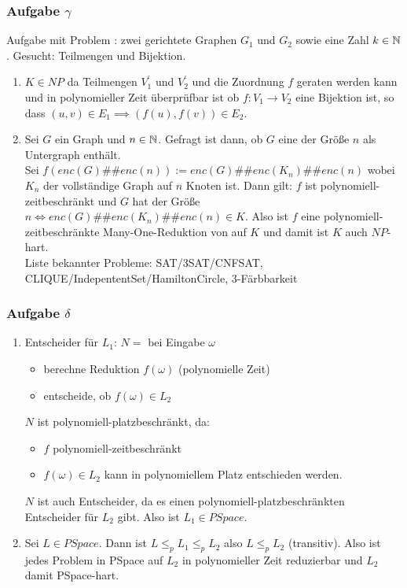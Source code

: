 \subsubsection*{Aufgabe $\gamma$}
    Aufgabe mit Problem : zwei gerichtete Graphen $G_{1}$ und $G_{2}$ sowie eine Zahl $k \in \mathbb{N}$. Gesucht: Teilmengen und Bijektion.
    \begin{enumerate}
        \item $K \in \mathit{NP}$ da Teilmengen $V^{'}_{1}$ und $V^{'}_{2}$ und die Zuordnung $f$ geraten werden kann und in polynomieller Zeit überprüfbar ist ob $f: V_{1} \to V_{2}$ eine Bijektion ist, so dass $(u,v) \in E_{1} \implies (f(u), f(v)) \in E_{2}$.

        \item Sei $G$ ein Graph und $n \in \mathbb{N}$. Gefragt ist dann, ob $G$ eine  der Größe $n$ als Untergraph enthält.\\
        Sei $f(enc(G)\#\#enc(n)) := enc(G)\#\#enc(K_{n})\#\#enc(n)$ wobei $K_{n}$ der vollständige Graph auf $n$ Knoten ist. Dann gilt: $f$ ist polynomiell-zeitbeschränkt und $G$ hat  der Größe \\ $n \Longleftrightarrow enc(G)\#\#enc(K_{n})\#\#enc(n) \in K$. Also ist $f$ eine polynomiell-zeitbeschränkte Many-One-Reduktion von  auf $K$ und damit ist $K$ auch $NP$-hart. \\
        Liste bekannter Probleme: SAT/3SAT/CNFSAT, CLIQUE/IndepententSet/HamiltonCircle, 3-Färbbarkeit
    \end{enumerate}

\newpage
\subsubsection*{Aufgabe $\delta$}
    \begin{enumerate}
        \item Entscheider für $L_{1}$: $N =$ bei Eingabe $\omega$
            \begin{itemize}
                \item berechne Reduktion $f(\omega)$ (polynomielle Zeit)
                \item entscheide, ob $f(\omega) \in L_{2}$
            \end{itemize}
        $N$ ist polynomiell-platzbeschränkt, da:
        \begin{itemize}
            \item $f$ polynomiell-zeitbeschränkt
            \item $f(\omega) \in L_{2}$ kann in polynomiellem Platz entschieden werden.
        \end{itemize}
        $N$ ist auch Entscheider, da es einen polynomiell-platzbeschränkten Entscheider für $L_{2}$ gibt. Also ist $L_{1} \in \mathit{PSpace}$.

        \item Sei $L \in \mathit{PSpace}$. Dann ist $L \leq_{p} L_{1} \leq_{p} L_{2}$ also $L \leq_{p} L_{2}$ (transitiv). Also ist jedes Problem in PSpace auf $L_{2}$ in polynomieller Zeit reduzierbar und $L_{2}$ damit PSpace-hart.
    \end{enumerate}


